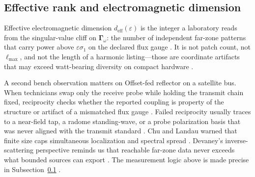 \subsection{Effective rank and electromagnetic dimension}
\label{sec:ch464}
Effective electromagnetic dimension $d_{\mathrm{eff}}(\varepsilon)$ is the integer a laboratory reads from the singular-value cliff on $\boldsymbol{\Gamma}_\omega$: the number of independent far-zone patterns that carry power above $\varepsilon\sigma_{1}$ on the declared flux gauge \cite{harrington2001}. It is not patch count, not $\ell_{\max}$, and not the length of a harmonic listing---those are coordinate artifacts that may exceed watt-bearing diversity on compact hardware \cite{hansen1988}.
\begin{physicalvignette}
A second bench observation matters on Offset-fed reflector on a satellite bus. When technicians swap only the receive probe while holding the transmit chain fixed, reciprocity checks whether the reported coupling is property of the structure or artifact of a mismatched flux gauge \cite{stratton1941}. Failed reciprocity usually traces to a near-field tap, a radome standing-wave, or a probe polarization basis that was never aligned with the transmit standard \cite{hansen1988}.
Chu and Landau warned that finite size caps simultaneous localization and spectral spread \cite{chu1948}. Devaney's inverse-scattering perspective reminds us that reachable far-zone data never exceeds what bounded sources can export \cite{devaney2004}.
The measurement logic above is made precise in Subsection~\ref{sec:ch464} \cite{stratton1941}.
\end{physicalvignette}
